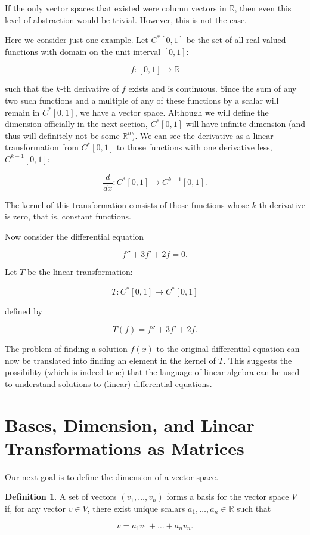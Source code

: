 \documentclass[
]{book}
\theoremstyle{definition}
\newtheorem{definition}{Definition}[chapter]
\theoremstyle{definition}
\theoremstyle{definition}
\theoremstyle{definition}
\theoremstyle{remark}
\begin{document}
If the only vector spaces that existed were column vectors in \(\mathbb{R}\), then even this level of abstraction would be trivial. However, this is not the case.

Here we consider just one example. Let \(C^*[0,1]\) be the set of all real-valued functions with domain on the unit interval \([0,1]\):

\[
f : [0,1] \to \mathbb{R}
\]

such that the \(k\)-th derivative of \(f\) exists and is continuous. Since the sum of any two such functions and a multiple of any of these functions by a scalar will remain in \(C^*[0,1]\), we have a vector space. Although we will define the dimension officially in the next section, \(C^*[0,1]\) will have infinite dimension (and thus will definitely not be some \(\mathbb{R}^n\)). We can see the derivative as a linear transformation from \(C^*[0,1]\) to those functions with one derivative less, \(C^{k-1}[0,1]\):

\[
\frac{d}{dx} : C^*[0,1] \to C^{k-1}[0,1].
\]

The kernel of this transformation consists of those functions whose \(k\)-th derivative is zero, that is, constant functions.

Now consider the differential equation

\[
f'' + 3f' + 2f = 0.
\]

Let \(T\) be the linear transformation:

\[
T : C^*[0,1] \to C^*[0,1]
\]

defined by

\[
T(f) = f'' + 3f' + 2f.
\]

The problem of finding a solution \(f(x)\) to the original differential equation can now be translated into finding an element in the kernel of \(T\). This suggests the possibility (which is indeed true) that the language of linear algebra can be used to understand solutions to (linear) differential equations.

\hypertarget{bases-dimension-and-linear-transformations-as-matrices}{%
\section{Bases, Dimension, and Linear Transformations as Matrices}\label{bases-dimension-and-linear-transformations-as-matrices}}

Our next goal is to define the dimension of a vector space.

\begin{definition}
A set of vectors \((v_1, \dots, v_n)\) forms a basis for the vector space \(V\) if, for any vector \(v \in V\), there exist unique scalars \(a_1, \dots, a_n \in \mathbb{R}\) such that

\[
v = a_1v_1 + \dots + a_nv_n.
\]
\end{definition}
\end{document}
